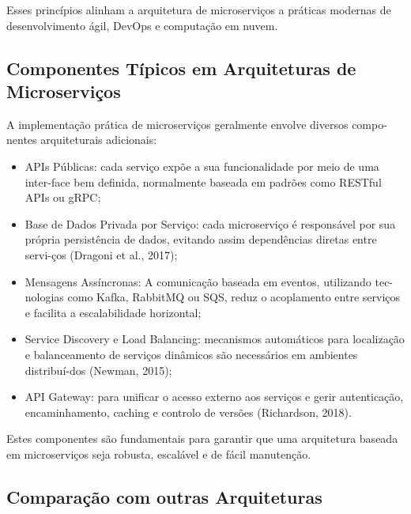 Esses princípios alinham a arquitetura de microserviços a práticas modernas de desenvolvimento ágil, DevOps e computação em nuvem.

\subsection{Componentes Típicos em Arquiteturas de Microserviços}

A implementação prática de microserviços geralmente envolve diversos compo-nentes arquiteturais adicionais:

\begin{itemize}
    \item APIs Públicas: cada serviço expõe a sua funcionalidade por meio de uma inter-face bem definida, normalmente baseada em padrões como RESTful APIs ou gRPC;
    \item Base de Dados Privada por Serviço: cada microserviço é responsável por sua própria persistência de dados, evitando assim dependências diretas entre servi-ços (Dragoni et al., 2017);
    \item Mensagens Assíncronas: A comunicação baseada em eventos, utilizando tec-nologias como Kafka, RabbitMQ ou SQS, reduz o acoplamento entre serviços e facilita a escalabilidade horizontal;
    \item Service Discovery e Load Balancing: mecanismos automáticos para localização e balanceamento de serviços dinâmicos são necessários em ambientes distribuí-dos (Newman, 2015);
    \item API Gateway: para unificar o acesso externo aos serviços e gerir autenticação, encaminhamento, caching e controlo de versões (Richardson, 2018).
\end{itemize}

Estes componentes são fundamentais para garantir que uma arquitetura baseada em microserviços seja robusta, escalável e de fácil manutenção.

\subsection{Comparação com outras Arquiteturas}

